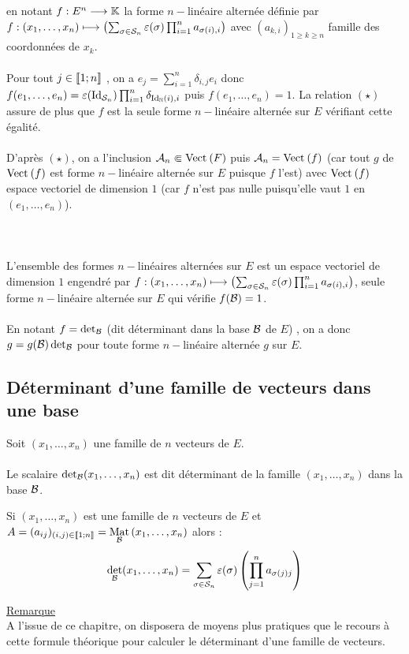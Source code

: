 \begin{dem}
    en notant \(f : E^n \to \K\) la forme \(n-\)linéaire alternée définie par \(f : (x_1, \dots , x_n) \mapsto \paren{\sum_{\sigma \in\cal{S}_n}\epsilon(\sigma)\prod^n_{i=1} a_{\sigma (i),i}}\) avec \((a_{k,i})_{1\geq k\geq n}\) famille des coordonnées de \(x_k\).\\~\\
    Pour tout \(j \in \interventierii{1}{n}\) , on a \(e_j =\sum^n_{i=1}\delta_{i,j} e_i\) donc \(f (e_1, \dots , e_n) = \epsilon(\id{\cal{S}_n})\prod^n_{i=1} \delta_{\id{\N}(i),i}\) puis \(f (e_1, \dots , e_n) = 1\). La relation \((\star)\) assure de plus que \(f\) est la seule forme \(n-\)linéaire alternée sur \(E\) vérifiant cette égalité.\\~\\
    D’après \((\star)\), on a l’inclusion \(\cal{A}_n \Subset \Vect{F}\) puis \(\cal{A}_n = \Vect{f}\) (car tout \(g\) de \(\Vect{f}\) est forme \(n-\)linéaire alternée sur \(E\) puisque \(f\) l’est) avec \(\Vect{f}\) espace vectoriel de dimension \(1\) (car \(f\) n’est pas nulle puisqu’elle vaut \(1\) en \((e_1, \dots , e_n)\)).\\~\\
    \conclusion\\~\\
     L’ensemble des formes \(n-\)linéaires alternées sur \(E\) est un espace vectoriel de dimension \(1\) engendré par \(f : (x_1, \dots , x_n) \mapsto \paren{\sum_{\sigma \in\cal{S}_n} \epsilon(\sigma ) \prod^n_{i=1} a_{\sigma (i),i}}\), seule forme \(n-\)linéaire alternée sur \(E\) qui vérifie \(f (\cal{B}) = 1\).\\~\\
     En notant \(f = \det_{\cal{B}}\) (dit déterminant dans la base \(\cal{B}\) de \(E\)) , on a donc \(g = g (\cal{B}) \det_{\cal{B}} \) pour toute forme \(n-\)linéaire alternée \(g\) sur \(E\).
\end{dem}
\subsection{Déterminant d’une famille de vecteurs dans une base}
\begin{defi}
    Soit \((x_1, \dots  , x_n)\) une famille de \(n\) vecteurs de \(E\).\\~\\
    Le scalaire \(\det_{\cal{B}} (x_1, \dots  , x_n)\) est dit déterminant de la famille \((x_1, \dots  , x_n)\) dans la base \(\cal{B}\).
\end{defi}
\begin{defprop}
    Si \((x_1, \dots  , x_n)\) est une famille de \(n\) vecteurs de \(E\) et \(A = (a_{ij} )_{(i,j)\in \interventierii{1}{n}} = \Mat{\cal{B}}{x_1, \dots  , x_n}\) alors :
    \[\det_{\cal{B}}(x_1, \dots  , x_n) = \sum_{\sigma \in \cal{S}_n} \epsilon (\sigma ) \paren{\prod^{n}_{j=1} a_{\sigma (j)j}}\]

    \underline{Remarque}\\
    A l’issue de ce chapitre, on disposera de moyens plus pratiques que le recours à cette formule théorique pour calculer le déterminant d’une famille de vecteurs.
\end{defprop}

